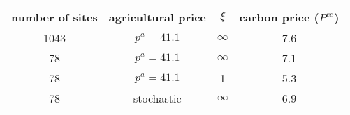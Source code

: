 \begin{tabular}{cccc}
\hline
number of sites & agricultural price & $\xi$ &  carbon price ($P^{ee}$)\\
\hline
1043 &$p^a=41.1$ & $\infty$ & 7.6 \\
78 & $p^a = 41.1$ & $\infty$ & 7.1 \\
78 &$p^a = 41.1$ & 1 & 5.3 \\
78 & stochastic  & $\infty$ & 6.9 \\
\hline
\end{tabular}